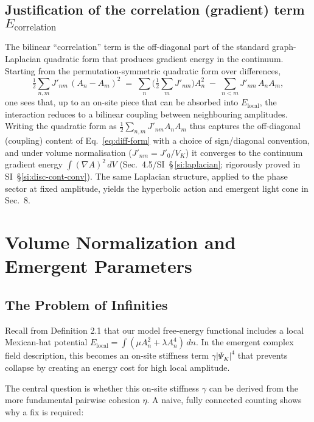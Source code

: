\documentclass[11pt]{article}
\begin{document}
\subsection{Justification of the correlation (gradient) term $E_{\text{correlation}}$}

The bilinear ``correlation'' term is the off-diagonal part of the standard graph-Laplacian quadratic form that produces gradient energy in the continuum. Starting from the permutation-symmetric quadratic form over differences,
\begin{equation}
\tfrac12\sum_{n,m} J'_{nm}\,(A_n-A_m)^2 \;=\; \sum_n \Big(\tfrac12\sum_m J'_{nm}\Big)A_n^2 \; - \; \sum_{n<m} J'_{nm}\,A_n A_m,\label{eq:diff-form}
\end{equation}
one sees that, up to an on-site piece that can be absorbed into $E_{\text{local}}$, the interaction reduces to a bilinear coupling between neighbouring amplitudes. Writing the quadratic form as $\tfrac12\sum_{n,m} J'_{nm} A_n A_m$ thus captures the off-diagonal (coupling) content of Eq.~\eqref{eq:diff-form} with a choice of sign/diagonal convention, and under volume normalisation ($J'_{nm}=J'_0/V_K$) it converges to the continuum gradient energy $\int (\nabla A)^2\,dV$ (Sec.~4.5/SI~\S\,\ref{si:laplacian}; rigorously proved in SI~\S\ref{si:disc-cont-conv}). The same Laplacian structure, applied to the phase sector at fixed amplitude, yields the hyperbolic action and emergent light cone in Sec.~8.

\section{Volume Normalization and Emergent Parameters}

\subsection{The Problem of Infinities}

Recall from Definition 2.1 that our model free-energy functional includes a local Mexican-hat potential $E_{\text{local}} = \int (\mu A_n^2 + \lambda A_n^4)\, dn$. In the emergent complex field description, this becomes an on-site stiffness term $\gamma|\Psi_K|^4$ that prevents collapse by creating an energy cost for high local amplitude.

The central question is whether this on-site stiffness $\gamma$ can be derived from the more fundamental pairwise cohesion $\eta$. A naive, fully connected counting shows why a fix is required:
\end{document}
